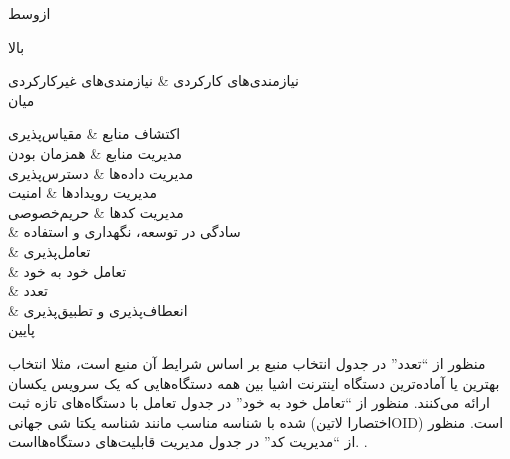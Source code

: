 
‌ازوسط

‌بالا

نیازمندی‌های کارکردی &
نیازمندی‌های غیرکارکردی \\

‌میان

اکتشاف منابع &
مقیاس‌پذیری \\

مدیریت منابع &
همزمان بودن \\

مدیریت داده‌ها &
دسترس‌پذیری \\

مدیریت رویدادها &
امنیت \\

مدیریت کدها &
حریم‌خصوصی \\

&
سادگی در توسعه، نگهداری و استفاده \\

&
تعامل‌پذیری \\

&
تعامل خود به خود \\

&
تعدد \\

&
انعطاف‌پذیری و تطبیق‌پذیری \\

‌پایین



منظور از ``تعدد'' در جدول  انتخاب منبع بر اساس شرایط آن منبع است، مثلا
انتخاب بهترین یا آماده‌ترین دستگاه اینترنت اشیا بین همه دستگاه‌هایی که یک سرویس یکسان ارائه می‌کنند.
منظور از ``تعامل خود به خود'' در جدول 
تعامل با دستگاه‌های تازه ثبت شده با شناسه مناسب مانند شناسه یکتا شی جهانی (اختصارا ‌لاتین{OID}) است.
منظور از ``مدیریت کد'' در جدول 
مدیریت قابلیت‌های دستگاه‌ها‌است.
.

